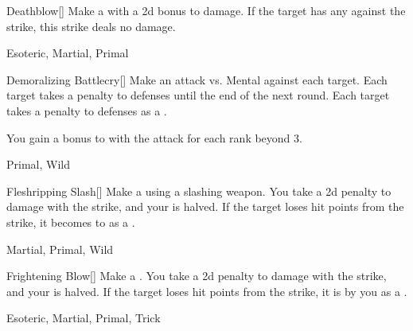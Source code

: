 \lowercase{\hypertarget{maneuver:Deathblow}{}}\label{maneuver:Deathblow}
\hypertarget{maneuver:Deathblow}{}
\begin{freeability}[Rank 3]{Deathblow}[]
Make a  with a \plus2d bonus to damage.
If the target has any  against the strike, this strike deals no damage.


 Esoteric, Martial, Primal
\end{freeability}
\vspace{0.25em}



\lowercase{\hypertarget{maneuver:Demoralizing Battlecry}{}}\label{maneuver:Demoralizing Battlecry}
\hypertarget{maneuver:Demoralizing Battlecry}{}
\begin{freeability}[Rank 3]{Demoralizing Battlecry}[]
Make an attack vs. Mental against each target.
\hit Each target takes a  penalty to defenses until the end of the next round.
\crit Each target takes a  penalty to defenses as a .

\rankline
You gain a  bonus to  with the attack for each rank beyond 3.


 Primal, Wild
\end{freeability}
\vspace{0.25em}



\lowercase{\hypertarget{maneuver:Fleshripping Slash}{}}\label{maneuver:Fleshripping Slash}
\hypertarget{maneuver:Fleshripping Slash}{}
\begin{freeability}[Rank 3]{Fleshripping Slash}[]
Make a  using a slashing weapon.
You take a \minus2d penalty to damage with the strike, and your  is halved.
If the target loses hit points from the strike, it becomes  to  as a .


 Martial, Primal, Wild
\end{freeability}
\vspace{0.25em}



\lowercase{\hypertarget{maneuver:Frightening Blow}{}}\label{maneuver:Frightening Blow}
\hypertarget{maneuver:Frightening Blow}{}
\begin{freeability}[Rank 3]{Frightening Blow}[]
Make a .
You take a \minus2d penalty to damage with the strike, and your  is halved.
If the target loses hit points from the strike, it is  by you as a .


 Esoteric, Martial, Primal, Trick
\end{freeability}
\vspace{0.25em}



